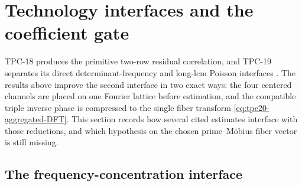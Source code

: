 \section{Technology interfaces and the coefficient gate}
\label{sec:tpc20-technology-boundary}

TPC-18 produces the primitive two-row residual correlation, and TPC-19
separates its direct determinant-frequency and long-lcm Poisson
interfaces \citep{WangTPC18,WangTPC19}.  The results above improve the
second interface in two exact ways: the four centered channels are placed
on one Fourier lattice before estimation, and the compatible triple
inverse phase is compressed to the single fiber transform
\eqref{eq:tpc20-aggregated-DFT}.  This section records how several cited
estimates interface with those reductions, and which
hypothesis on the chosen prime--M\"obius fiber vector is still missing.

\subsection{The frequency-concentration interface}

